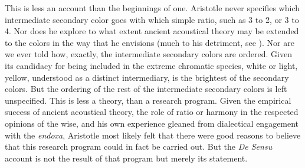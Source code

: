 This is less an account than the beginnings of one. Aristotle never specifies which intermediate secondary color goes with which simple ratio, such as 3 to 2, or 3 to 4. Nor does he explore to what extent ancient acoustical theory may be extended to the colors in the way that he envisions (much to his detriment, see \citealt{Sorabji:2022qf}). Nor are we ever told how, exactly, the intermediate secondary colors are ordered. Given its candidacy for being included in the extreme chromatic species, white or light, yellow, understood as a distinct intermediary, is the brightest of the secondary colors. But the ordering of the rest of the intermediate secondary colors is left unspecified. This is less a theory, than a research program. Given the empirical success of ancient acoustical theory, the role of ratio or harmony in the respected opinions of the wise, and his own experience gleaned from dialectical engagement with the \emph{endoxa}, Aristotle most likely felt that there were good reasons to believe that this research program could in fact be carried out. But the \emph{De Sensu} account is not the result of that program but merely its statement.


